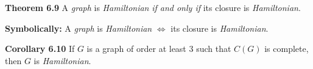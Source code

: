 \nopagenumbers
{\bf Theorem 6.9}
\vskip 6pt
A {\it graph} is {\it Hamiltonian} {\it if and only if} its closure is {\it Hamiltonian}.

\vskip 1in
{\bf Symbolically:}
\vskip 6pt
A {\it graph} is {\it Hamiltonian} $\Leftrightarrow$ its closure is {\it Hamiltonian}.

\vskip 1in
{\bf Corollary 6.10}
\vskip 6pt
If $G$ is a graph of order at least $3$ such that $C(G)$ is complete, then $G$ is {\it Hamiltonian}. 
\vfill\eject
